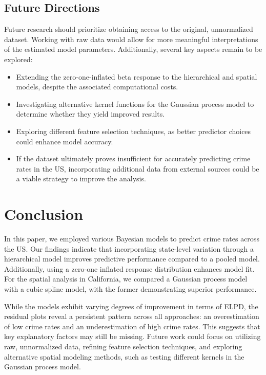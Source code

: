 \documentclass[12pt]{article}
\begin{document}
\subsection{Future Directions}  
Future research should prioritize obtaining access to the original, unnormalized dataset. Working with raw data would allow for more meaningful interpretations of the estimated model parameters. Additionally, several key aspects remain to be explored:  

\begin{itemize}
    \item Extending the zero-one-inflated beta response to the hierarchical and spatial models, despite the associated computational costs.
    \item Investigating alternative kernel functions for the Gaussian process model to determine whether they yield improved results.
    \item Exploring different feature selection techniques, as better predictor choices could enhance model accuracy.
    \item If the dataset ultimately proves insufficient for accurately predicting crime rates in the US, incorporating additional data from external sources could be a viable strategy to improve the analysis.
\end{itemize}

\section{Conclusion}

In this paper, we employed various Bayesian models to predict crime rates across the US. Our findings indicate that incorporating state-level variation through a hierarchical model improves predictive performance compared to a pooled model. Additionally, using a zero-one inflated response distribution enhances model fit. For the spatial analysis in California, we compared a Gaussian process model with a cubic spline model, with the former demonstrating superior performance.

While the models exhibit varying degrees of improvement in terms of ELPD, the residual plots reveal a persistent pattern across all approaches: an overestimation of low crime rates and an underestimation of high crime rates. This suggests that key explanatory factors may still be missing. Future work could focus on utilizing raw, unnormalized data, refining feature selection techniques, and exploring alternative spatial modeling methods, such as testing different kernels in the Gaussian process model.
\end{document}
